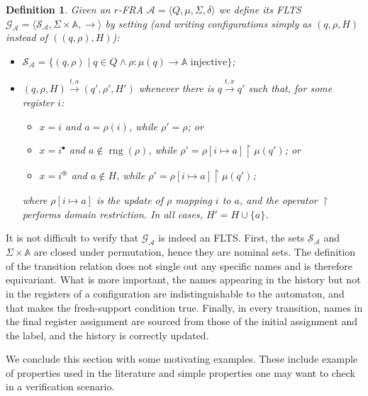 \documentclass[10pt,a4paper]{article}
\newtheorem{definition}[theorem]{Definition}
\theoremstyle{definition}
\theoremstyle{remark}
\newcommand\Lfr[1]{#1^\bullet}
\newcommand\Gfr[1]{#1^\circledast}
\DeclareMathOperator{\rng}{rng}
\newcommand\Acal{\mathcal{A}}
\newcommand\Gcal{\mathcal{G}}
\newcommand\Scal{\mathcal{S}}
\newcommand\Atoms{\mathbb{A}}
\begin{document}
\begin{definition}
  Given an $r$-FRA $\Acal=\langle Q,\mu,\Sigma,\delta\rangle$ we define its FLTS $\Gcal_\Acal=\langle \Scal_\Acal,\Sigma\times\Atoms,\to\rangle$ by setting (and writing configurations simply as $(q,\rho,H)$ instead of $((q,\rho),H)$):
  \begin{itemize}
    \item 
$ \Scal_\Acal = \{(q,\rho)\mid q\in Q\land \rho:\mu(q)\to\Atoms\text{ injective}\}
$;
\item
  $(q,\rho,H)\xrightarrow{t,a}(q',\rho',H')$ whenever there is $q\xrightarrow{t,x}q'$ such that, for some register $i$:
  \begin{itemize}
    \item 
$x=i$ and $a=\rho(i)$, while $\rho'=\rho$; or
\item
$x=\Lfr i$ and $a\notin\rng(\rho)$, while $\rho'=\rho[i\mapsto a]\upharpoonright\mu(q')$; or
\item
$x=\Gfr i$ and $a\notin H$, while $\rho'=\rho[i\mapsto a]\upharpoonright\mu(q')$;
\end{itemize}
where $\rho[i\mapsto a]$ is the update of $\rho$ mapping $i$ to $a$, and the operator $\upharpoonright$ performs domain restriction. In all cases, $H'=H\cup\{a\}$.
\end{itemize}
\end{definition}

It is not difficult to verify that $\Gcal_\Acal$ is indeed an FLTS. First, the sets $\Scal_\Acal$ and $\Sigma\times\Atoms$ are closed under permutation, hence they are nominal sets. The definition of the transition relation does not single out any specific names and is therefore equivariant. What is more important, the names appearing in the history but not in the registers of a configuration are indistinguishable to the automaton, and that makes the fresh-support condition true. Finally, in every transition, names in the final register assignment are sourced from those of the initial assignment and the label, and the history is correctly updated.

We conclude this section with some motivating examples. These include example of properties used in the literature and simple properties one may want to check in a verification scenario.
\end{document}
